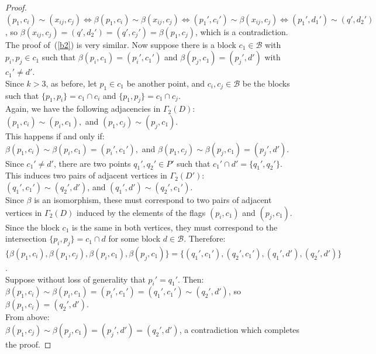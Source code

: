 \documentclass[10pt,a4paper]{amsart}
\begin{document}
\begin{proof}
$(p_1,c_i)\sim(x_{ij},c_j)\iff\beta(p_1,c_i)\sim\beta(x_{ij},c_j)\iff(p_1',c_i')\sim\beta(x_{ij},c_j)\iff(p_1',d_1')\sim(q',d_2')$, so $\beta(x_{ij},c_j)=(q',d_2')=(q',c_j')=\beta(p_1,c_j)$, which is a contradiction.\\

The proof of~(\ref{b2}) is very similar. Now suppose there is a block $c_1\in\mathcal{B}$ with $p_i,p_j\in c_1$ such that $\beta(p_i,c_1)=(p_i',c_1')$ and $\beta(p_j,c_1)=(p_j',d')$ with $c_1'\neq d'$.\\

Since $k>3$, as before, let $p_1\in c_1$ be another point, and $c_i,c_j\in\mathcal{B}$ be the blocks such that $\{p_1,p_i\}=c_1\cap c_i$ and $\{p_1,p_j\}=c_1\cap c_j$.\\

Again, we have the following adjacencies in $\Gamma_2(D)$:\\

$(p_1,c_i)\sim(p_i,c_1),$ and $(p_1,c_j)\sim(p_j,c_1)$.\\

This happens if and only if:\\

$\beta(p_1,c_i)\sim\beta(p_i,c_1)=(p_i',c_1'),$ and $\beta(p_1,c_j)\sim\beta(p_j,c_1)=(p_j',d')$.\\

Since $c_1'\neq d'$, there are two points $q_1',q_2'\in P'$ such that $c_1'\cap d'=\{q_1',q_2'\}$. This induces two pairs of adjacent vertices in $\Gamma_2(D')$:\\

$(q_1',c_1')\sim(q_2',d')$, and $(q_1',d')\sim(q_2',c_1')$.\\

Since $\beta$ is an isomorphism, these must correspond to two pairs of adjacent vertices in $\Gamma_2(D)$ induced by the elements of the flags $(p_i,c_1)$ and $(p_j,c_1)$. Since the block $c_1$ is the same in both vertices, they must correspond to the intersection $\{p_i,p_j\}=c_1\cap d$ for some block $d\in\mathcal{B}$. Therefore:\\

$\{\beta(p_1,c_i),\beta(p_1,c_j),\beta(p_i,c_1),\beta(p_j,c_1)\}=\{(q_1',c_1'),(q_2',c_1'),(q_1',d'),(q_2',d')\}$.\\

Suppose without loss of generality that $p_i'=q_1'$. Then:\\

$\beta(p_1,c_i)\sim\beta(p_i,c_1)=(p_i',c_1')=(q_1',c_1')\sim(q_2',d')$, so $\beta(p_1,c_i)=(q_2',d')$.\\

From above:\\

$\beta(p_1,c_j)\sim\beta(p_j,c_1)=(p_j',d')=(q_2',d')$, a contradiction which completes the proof.
\end{proof}
\end{document}
